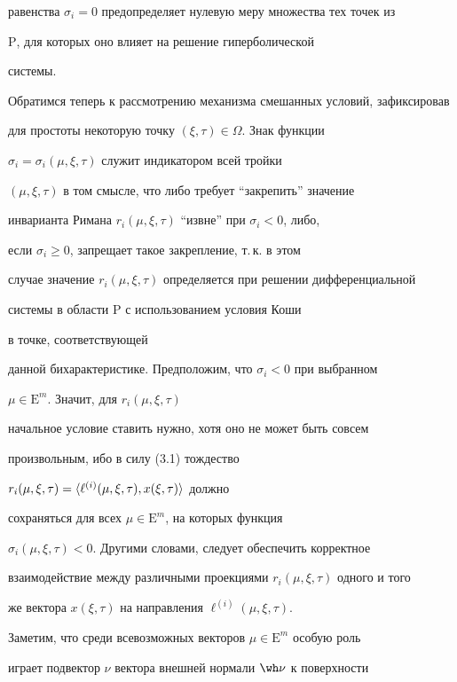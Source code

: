 равенства $\sigma_i=0$ предопределяет нулевую меру множества тех точек из


$\mathrm P$, для которых оно влияет на решение гиперболической 


системы.





Обратимся теперь к рассмотрению механизма смешанных условий, зафиксировав


для простоты некоторую точку $(\xi, \tau) \in \Omega$. Знак функции 


$\sigma_i=\sigma_i (\mu, \xi,\tau)$ служит индикатором всей тройки 


$(\mu,\xi,\tau)$ в том смысле, что либо требует ``закрепить'' значение 


инварианта Римана $r_i (\mu,\xi,\tau)$ ``извне'' при $\sigma_i < 0$, либо,


если $\sigma_i \geq 0$, запрещает такое закрепление, т.\,к. в этом 


случае значение $r_i (\mu,\xi,\tau)$ определяется при решении дифференциальной


системы в области $\mathrm P$ с использованием условия Коши


в точке, соответствующей 


данной бихарактеристике. Предположим, что $\sigma_i < 0$ при выбранном 


$\mu \in {\mathrm E}^m$. Значит, для $r_i (\mu,\xi,\tau)$ 


начальное условие ставить нужно, хотя оно не может быть совсем


произвольным, ибо в силу (3.1) тождество 


$r_i (\mu,\xi,\tau)=\langle\ell^{(i)} (\mu,\xi,\tau), x(\xi,\tau)\rangle$ должно 


сохраняться для всех $\mu \in {\mathrm E}^m$, на которых функция 


$\sigma_i (\mu,\xi,\tau) < 0$. Другими словами, следует обеспечить корректное


взаимодействие между различными проекциями $r_i (\mu,\xi,\tau)$ одного и того


же вектора $x(\xi,\tau)$ на направления $\ell^{(i)} (\mu,\xi,\tau)$.





Заметим, что среди всевозможных векторов $\mu \in {\mathrm E}^m$ особую роль 


играет подвектор $\nu$ вектора внешней нормали $\wh \nu$ к поверхности


